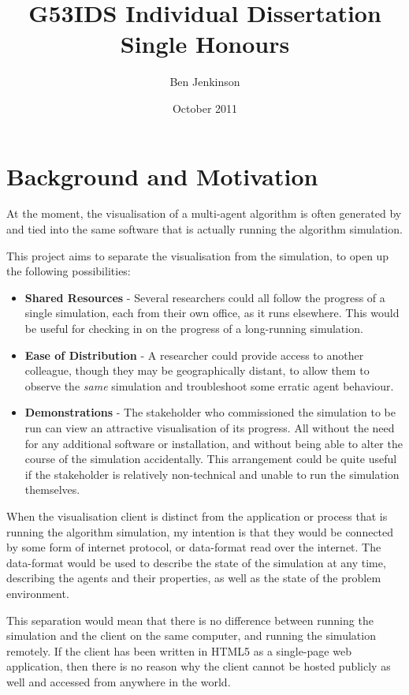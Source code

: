 \documentclass[a4paper]{article}
\title{G53IDS Individual Dissertation Single Honours}
\author{Ben Jenkinson}
\date{October 2011}
\begin{document}
	

	\section{Background and Motivation}

		At the moment, the visualisation of a multi-agent algorithm is often generated by and tied into the same software that is actually running the algorithm simulation.

		This project aims to separate the visualisation from the simulation, to open up the following possibilities:

		\begin{itemize}

			\item \textbf{Shared Resources} - Several researchers could all follow the progress of a single simulation, each from their own office, as it runs elsewhere. This would be useful for checking in on the progress of a long-running simulation.

			\item \textbf{Ease of Distribution} - A researcher could provide access to another colleague, though they may be geographically distant, to allow them to observe the \textit{same} simulation and troubleshoot some erratic agent behaviour.

			\item \textbf{Demonstrations} - The stakeholder who commissioned the simulation to be run can view an attractive visualisation of its progress. All without the need for any additional software or installation, and without being able to alter the course of the simulation accidentally. This arrangement could be quite useful if the stakeholder is relatively non-technical and unable to run the simulation themselves.

		\end{itemize}

		When the visualisation client is distinct from the application or process that is running the algorithm simulation, my intention is that they would be connected by some form of internet protocol, or data-format read over the internet. The data-format would be used to describe the state of the simulation at any time, describing the agents and their properties, as well as the state of the problem environment.

		This separation would mean that there is no difference between running the simulation and the client on the same computer, and running the simulation remotely. If the client has been written in HTML5 as a single-page web application, then there is no reason why the client cannot be hosted publicly as well and accessed from anywhere in the world.
\end{document}
